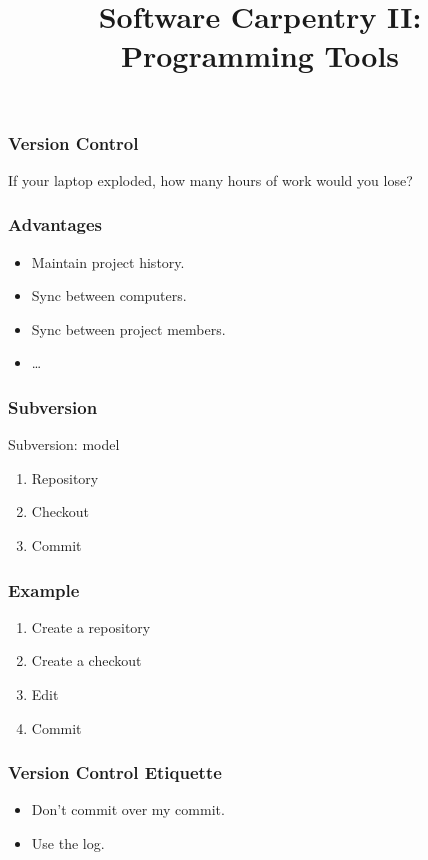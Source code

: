 
\title{Software Carpentry II: Programming Tools}

\frame{\maketitle}

\begin{frame}[fragile] %
\frametitle{Version Control}

If your laptop exploded, how many hours of work would you lose?
\end{frame}

\begin{frame}[fragile] %
\frametitle{Advantages}
\begin{itemize}
\item Maintain project history.
\item Sync between computers.
\item Sync between project members.
\item \ldots
\end{itemize}
\end{frame}

\begin{frame}[fragile] %
\frametitle{Subversion}
\begin{block}{Subversion: model}
\begin{enumerate}
\item Repository
\item Checkout
\item Commit
\end{enumerate}
\end{block}
\end{frame}

\begin{frame}[fragile] %
\frametitle{Example}
\begin{enumerate}
\item Create a repository
\item Create a checkout
\item Edit
\item Commit
\end{enumerate}
\end{frame}

\begin{frame}[fragile] %
\frametitle{Version Control Etiquette}
\begin{itemize}
\item Don't commit over my commit.
\item Use the log.
\end{itemize}
\end{frame}

